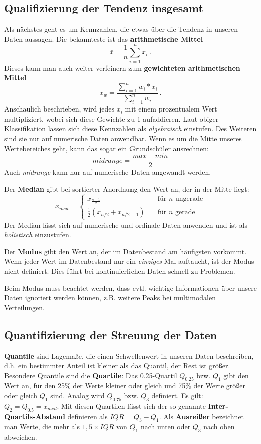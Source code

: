 \subsection{Qualifizierung der Tendenz insgesamt}
Als nächstes geht es um Kennzahlen, die etwas über die Tendenz in unseren Daten aussagen. Die bekannteste ist das \textbf{arithmetische Mittel}
\[\bar{x}= \frac{1}{n} \sum_{i=1}^n x_i\ .\]
Dieses kann man auch weiter verfeinern zum \textbf{gewichteten arithmetischen Mittel}
\[\bar{x}_w = \frac{\sum_{i=1}^n w_i * x_i}{\sum_{i=1}^n w_i}\ .\]
Anschaulich beschrieben, wird jedes \(x_i\) mit einem prozentualem Wert multipliziert, wobei sich diese Gewichte zu 1 aufaddieren.
Laut obiger Klassifikation lassen sich diese Kennzahlen als \textit{algebraisch} einstufen. Des Weiteren sind sie nur auf numerische Daten anwendbar.
Wenn es um die Mitte unseres Wertebereiches geht, kann das sogar ein Grundschüler ausrechnen:
\[midrange = \frac{max - min}{2}\]
Auch \textit{midrange} kann nur auf numerische Daten angewandt werden.

Der \textbf{Median} gibt bei sortierter Anordnung den Wert an, der in der Mitte liegt:
\[
x_{med} = 
\begin{cases}
	x_{\frac{n+1}{2}} &\quad \text{für } n \text{ ungerade}\\
	\frac{1}{2}(x_{n/2} + x_{n/2+1}) &\quad \text{für } n \text{ gerade}\
\end{cases}
\]
Der Median lässt sich auf numerische und ordinale Daten anwenden und ist als \textit{holistisch} einzustufen.

Der \textbf{Modus} gibt den Wert an, der im Datenbestand am häufigsten vorkommt. Wenn jeder Wert im Datenbestand nur ein \emph{einziges} Mal auftaucht, ist der Modus nicht definiert. Dies führt bei kontinuierlichen Daten schnell zu Problemen.

\noindent Beim Modus muss beachtet werden, dass evtl. wichtige Informationen über unsere Daten ignoriert werden können, z.B. weitere Peaks bei multimodalen Verteilungen.

\subsection{Quantifizierung der Streuung der Daten}
\textbf{Quantile} sind Lagemaße, die einen Schwellenwert in unseren Daten beschreiben, d.h. ein bestimmter Anteil ist kleiner als das Quantil, der Rest ist größer. Besondere Quantile sind die \textbf{Quartile}: Das 0.25-Quartil \(Q_{0.25}\) bzw. \(Q_1\) gibt den Wert an, für den 25\% der Werte kleiner oder gleich und 75\% der Werte größer oder gleich \(Q_1\) sind. Analog wird \(Q_{0.75}\) bzw. \(Q_3\) definiert. Es gilt: \(Q_2 = Q_{0.5} = x_{med}\). Mit diesen Quartilen lässt sich der so genannte \textbf{Inter-Quartils-Abstand} definieren als \(IQR = Q_3 - Q_1\). Als \textbf{Ausreißer} bezeichnet man Werte, die mehr als \(1,5 \times IQR\) von \(Q_1\) nach unten oder \(Q_3\) nach oben abweichen.

